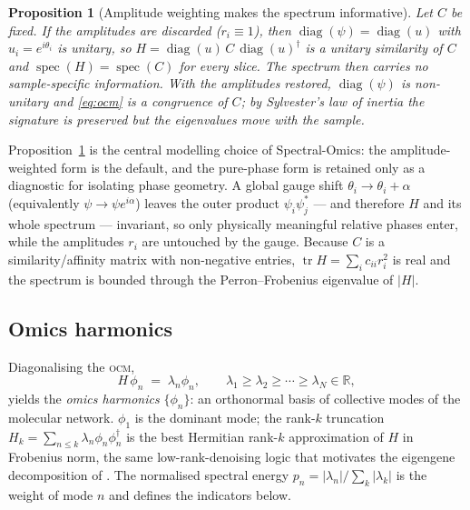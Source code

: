 \documentclass[preprint,12pt,amsmath,amssymb,superscriptaddress,floatfix]{revtex4-2}
\theoremstyle{definition}
\theoremstyle{plain}
\newtheorem{proposition}{Proposition}
\newcommand{\OCM}{\textsc{ocm}}
\begin{document}
\begin{proposition}[Amplitude weighting makes the spectrum informative]
\label{prop:amp}
Let $C$ be fixed. If the amplitudes are discarded ($r_i\equiv1$), then
$\operatorname{diag}(\psi)=\operatorname{diag}(u)$ with $u_i=e^{i\theta_i}$ is
\emph{unitary}, so $H=\operatorname{diag}(u)\,C\,\operatorname{diag}(u)^{\dagger}$
is a unitary similarity of $C$ and $\operatorname{spec}(H)=\operatorname{spec}(C)$
for every slice. The spectrum then carries no sample-specific information. With
the amplitudes restored, $\operatorname{diag}(\psi)$ is non-unitary and
\cref{eq:ocm} is a \emph{congruence} of $C$; by Sylvester's law of inertia the
signature is preserved but the eigenvalues move with the sample.
\end{proposition}

\noindent Proposition~\ref{prop:amp} is the central modelling choice of
Spectral-Omics: the amplitude-weighted form is the default, and the pure-phase
form is retained only as a diagnostic for isolating phase geometry. A global
gauge shift $\theta_i\to\theta_i+\alpha$ (equivalently $\psi\to\psi e^{i\alpha}$)
leaves the outer product $\psi_i\psi_j^{*}$ --- and therefore $H$ and its whole
spectrum --- invariant, so only physically meaningful relative phases enter,
while the amplitudes $r_i$ are untouched by the gauge. Because $C$ is a
similarity/affinity matrix with non-negative entries, $\operatorname{tr}H =
\sum_i c_{ii}r_i^2$ is real and the spectrum is bounded through the
Perron--Frobenius eigenvalue of $|H|$.

\subsection{Omics harmonics}
\label{sec:theory-harmonics}

Diagonalising the \OCM,
\begin{equation}
  H\,\phi_n \;=\; \lambda_n \phi_n,\qquad
  \lambda_1\ge\lambda_2\ge\cdots\ge\lambda_N \in\mathbb{R},
  \label{eq:harmonics}
\end{equation}
yields the \emph{omics harmonics} $\{\phi_n\}$: an orthonormal basis of
collective modes of the molecular network. $\phi_1$ is the dominant mode; the
rank-$k$ truncation $H_k = \sum_{n\le k}\lambda_n\phi_n\phi_n^{\dagger}$ is the
best Hermitian rank-$k$ approximation of $H$ in Frobenius norm, the same
low-rank-denoising logic that motivates the eigengene decomposition of
\citet{alter2000svd}. The normalised spectral energy
$p_n = |\lambda_n|/\sum_k|\lambda_k|$ is the weight of mode $n$ and defines the
indicators below.
\end{document}
